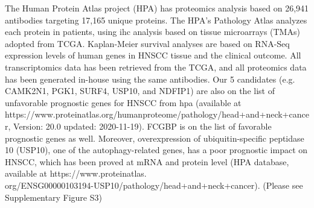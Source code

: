 \documentclass[jpm,article,submit,moreauthors,pdftex]{Definitions/mdpi}
\begin{document}
\begin{paracol}{2}
 
The Human Protein Atlas project (HPA) has proteomics analysis based on 26,941 antibodies targeting 17,165 unique proteins. The HPA's Pathology Atlas analyzes each protein in patients, using \acrshort{ihc} analysis based on tissue microarrays (TMAs) adopted from TCGA. Kaplan-Meier survival analyses are based on RNA-Seq expression levels of human genes in HNSCC tissue and the clinical outcome.
All transcriptomics data has been retrieved from the TCGA, and all proteomics data has been generated in-house using the same antibodies.
Our 5 candidates (e.g. CAMK2N1, PGK1, SURF4, USP10, and NDFIP1) are also on the list of unfavorable prognostic genes for HNSCC from \acrshort{hpa} (available at https://www.proteinatlas.org/humanproteome/pathology/head+and+neck+cancer, Version: 20.0 updated: 2020-11-19). 
FCGBP is on the list of favorable prognostic genes as well.
Moreover, overexpression of ubiquitin-specific peptidase 10 (USP10), one of the autophagy-related genes, has a poor prognostic impact on HNSCC, which has been proved at mRNA and protein level (HPA database, available at https://www.proteinatlas.\\
org/ENSG00000103194-USP10/pathology/head+and+neck+cancer)\cite{Ren2020}.
(Please see Supplementary Figure S3)%







\end{paracol}
\end{document}
